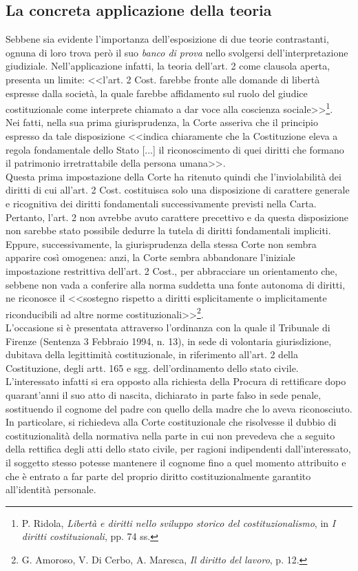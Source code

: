 \subsection{La concreta applicazione della teoria}
Sebbene sia evidente l'importanza dell'esposizione di due teorie contrastanti, ognuna di loro trova però il suo \textit{banco di prova} nello svolgersi dell’interpretazione giudiziale.
Nell'applicazione infatti, la teoria dell'art. 2 come clausola aperta, presenta un limite: <<l’art. 2 Cost. farebbe fronte alle domande di libertà espresse dalla società, la quale farebbe affidamento sul ruolo del giudice costituzionale come interprete chiamato a dar voce alla coscienza sociale>>\footnote{P. Ridola, \textit{Libertà e diritti nello sviluppo storico del costituzionalismo}, in \textit{I diritti costituzionali}, pp. 74 ss.}.
\\Nei fatti, nella sua prima giurisprudenza, la Corte asseriva che il principio espresso da tale disposizione <<indica chiaramente che la Costituzione eleva a regola fondamentale dello Stato [...] il riconoscimento di quei diritti che formano il patrimonio irretrattabile della persona umana>>.
\\Questa prima impostazione della Corte ha ritenuto quindi che l’inviolabilità dei diritti di cui all’art. 2 Cost. costituisca solo una disposizione di carattere generale e ricognitiva dei diritti fondamentali successivamente previsti nella Carta. 
Pertanto, l’art. 2 non avrebbe avuto carattere precettivo e da questa disposizione non sarebbe stato possibile dedurre la tutela di diritti fondamentali impliciti.
\\Eppure, successivamente, la giurisprudenza della stessa Corte non sembra apparire così omogenea: anzi, la Corte sembra abbandonare l’iniziale impostazione restrittiva dell’art. 2 Cost., per abbracciare un orientamento che, sebbene non vada a conferire alla norma suddetta una fonte autonoma di diritti, ne riconosce il <<sostegno rispetto a diritti esplicitamente o implicitamente riconducibili ad altre norme costituzionali>>\footnote{G. Amoroso, V. Di Cerbo, A. Maresca, \textit{Il diritto del lavoro}, p. 12.}.
\\L’occasione si è presentata attraverso l’ordinanza con la quale il Tribunale di Firenze (Sentenza 3 Febbraio 1994, n. 13), in sede di volontaria giurisdizione, dubitava della legittimità costituzionale, in riferimento all’art. 2 della Costituzione, degli artt. 165 e sgg. dell'ordinamento dello stato civile. 
\\L'interessato infatti si era opposto alla richiesta della Procura di rettificare dopo quarant’anni il suo atto di nascita, dichiarato in parte falso in sede penale, sostituendo il cognome del padre con quello della madre che lo aveva riconosciuto. In particolare, si richiedeva alla Corte costituzionale che risolvesse il dubbio di costituzionalità della normativa nella parte in cui non prevedeva che a seguito della rettifica degli atti dello stato civile, per ragioni indipendenti dall'interessato, il soggetto stesso potesse mantenere il cognome fino a quel momento attribuito e che è entrato a far parte del proprio diritto costituzionalmente garantito all'identità personale. 
